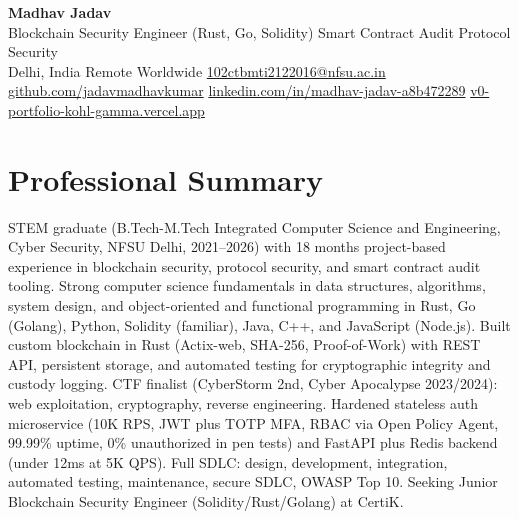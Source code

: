 \documentclass[9pt,letterpaper]{article}
\begin{document}
\begin{center}
{\LARGE \textbf{Madhav Jadav}}\\[2pt]
{\small Blockchain Security Engineer (Rust, Go, Solidity) \textbar{} Smart Contract Audit \textbar{} Protocol Security}\\[2pt]
{\small Delhi, India \textbar{} Remote Worldwide \textbar{} \href{mailto:102ctbmti2122016@nfsu.ac.in}{102ctbmti2122016@nfsu.ac.in}}\\[2pt]
{\small \href{https://github.com/jadavmadhavkumar}{github.com/jadavmadhavkumar} \textbar{} \href{https://www.linkedin.com/in/madhav-jadav-a8b472289}{linkedin.com/in/madhav-jadav-a8b472289} \textbar{} \href{http://v0-portfolio-kohl-gamma.vercel.app}{v0-portfolio-kohl-gamma.vercel.app}}\\
\end{center}

\section{Professional Summary}
STEM graduate (B.Tech-M.Tech Integrated Computer Science and Engineering, Cyber Security, NFSU Delhi, 2021--2026) with 18 months project-based experience in blockchain security, protocol security, and smart contract audit tooling. Strong computer science fundamentals in data structures, algorithms, system design, and object-oriented and functional programming in Rust, Go (Golang), Python, Solidity (familiar), Java, C++, and JavaScript (Node.js). Built custom blockchain in Rust (Actix-web, SHA-256, Proof-of-Work) with REST API, persistent storage, and automated testing for cryptographic integrity and custody logging. CTF finalist (CyberStorm 2nd, Cyber Apocalypse 2023/2024): web exploitation, cryptography, reverse engineering. Hardened stateless auth microservice (10K RPS, JWT plus TOTP MFA, RBAC via Open Policy Agent, 99.99\% uptime, 0\% unauthorized in pen tests) and FastAPI plus Redis backend (under 12ms at 5K QPS). Full SDLC: design, development, integration, automated testing, maintenance, secure SDLC, OWASP Top 10. Seeking Junior Blockchain Security Engineer (Solidity/Rust/Golang) at CertiK.

\end{document}
